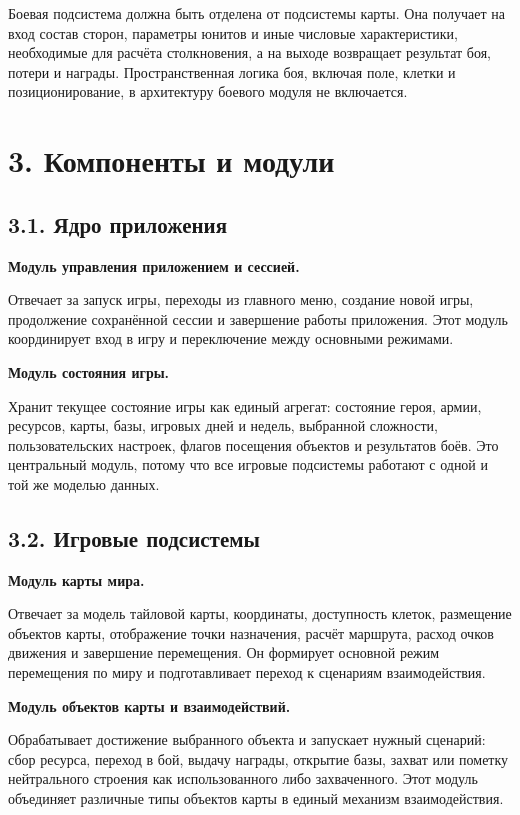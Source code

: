 \documentclass[12pt,a4paper]{article}
\begin{document}
Боевая подсистема должна быть отделена от подсистемы карты. Она получает на вход состав сторон, параметры юнитов и иные числовые характеристики, необходимые для расчёта столкновения, а на выходе возвращает результат боя, потери и награды. Пространственная логика боя, включая поле, клетки и позиционирование, в архитектуру боевого модуля не включается.

\section*{3. Компоненты и модули}

\subsection*{3.1. Ядро приложения}

\textbf{Модуль управления приложением и сессией.}

Отвечает за запуск игры, переходы из главного меню, создание новой игры, продолжение сохранённой сессии и завершение работы приложения. Этот модуль координирует вход в игру и переключение между основными режимами.

\textbf{Модуль состояния игры.}

Хранит текущее состояние игры как единый агрегат: состояние героя, армии, ресурсов, карты, базы, игровых дней и недель, выбранной сложности, пользовательских настроек, флагов посещения объектов и результатов боёв. Это центральный модуль, потому что все игровые подсистемы работают с одной и той же моделью данных.

\subsection*{3.2. Игровые подсистемы}

\textbf{Модуль карты мира.}

Отвечает за модель тайловой карты, координаты, доступность клеток, размещение объектов карты, отображение точки назначения, расчёт маршрута, расход очков движения и завершение перемещения. Он формирует основной режим перемещения по миру и подготавливает переход к сценариям взаимодействия.

\textbf{Модуль объектов карты и взаимодействий.}

Обрабатывает достижение выбранного объекта и запускает нужный сценарий: сбор ресурса, переход в бой, выдачу награды, открытие базы, захват или пометку нейтрального строения как использованного либо захваченного. Этот модуль объединяет различные типы объектов карты в единый механизм взаимодействия.
\end{document}

